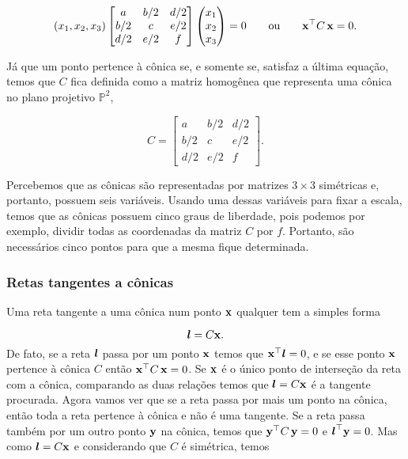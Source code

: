 \begin{equation*}
(x_1,x_2,x_3) 
 \begin{bmatrix}
  a & b/2 & d/2\\
  b/2 & c & e/2\\
  d/2 & e/2 & f
  \end{bmatrix}
 \begin{pmatrix}
  x_1\\
  x_2\\
  x_3
  \end{pmatrix}
 = 0
 \qquad \text{ou} \qquad
 \mathbf{x}^\top C\,\mathbf{x} = 0.
\end{equation*}

Já que um ponto pertence à cônica se, e somente se, satisfaz a última equação, temos que $C$ fica definida como a matriz homogênea que representa uma cônica no plano projetivo $\mathbb{P}^2$,

\begin{equation*}
C =  \begin{bmatrix}
      a & b/2 & d/2\\
      b/2 & c & e/2\\
      d/2 & e/2 & f
      \end{bmatrix}.
\end{equation*}

Percebemos que as cônicas são representadas por matrizes $3\times3$ simétricas e, portanto, possuem seis variáveis. Usando uma dessas variáveis para fixar a escala, temos que as cônicas possuem cinco graus de liberdade, pois podemos por exemplo, dividir todas as coordenadas da matriz $C$ por $f$. Portanto, são necessários cinco pontos para que a mesma fique determinada.  \\

\subsubsection*{Retas tangentes a cônicas} 

Uma reta tangente a uma cônica num ponto $\mathbf{x}$ qualquer tem a simples forma

\begin{equation*}
\boldsymbol{l}=C\mathbf{x}.
\end{equation*}
De fato, se a reta $\boldsymbol{l}$ passa por um ponto $\mathbf{x}$ temos que $\mathbf{x}^\top\boldsymbol{l}=0$, e se esse ponto $\mathbf{x}$ pertence à cônica $C$ então $\mathbf{x}^\top C\,\mathbf{x}=0$. Se $\mathbf{x}$ é o único ponto de interseção da reta com a cônica, comparando as duas relações  temos que $\boldsymbol{l}=C\mathbf{x}$ é a tangente procurada. Agora vamos ver que se a reta passa por mais um ponto na cônica, então toda a reta pertence à cônica e não é uma tangente.
Se a reta passa também por um outro ponto ${\bf y}$ na cônica, temos que ${\bf y}^\top C\,{\bf y}=0$ e $\boldsymbol{l}^\top{\bf y}=0$. Mas como $\boldsymbol{l}=C\mathbf{x}$ e considerando que $C$ é simétrica, temos


